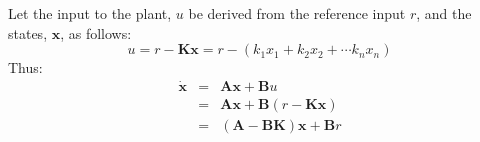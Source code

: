 Let the input to the plant, $u$ be derived from the reference input $r$, and the states, $\mathbf{x}$, as follows:
\[
u=r-\mathbf{Kx}=r-(k_1x_1+k_2x_2+\cdots k_nx_n)
\]
Thus:
\begin{eqnarray*}
	\dot{\mathbf{x}} & = & \mathbf{Ax}+\mathbf{B}u \\
	                 & = & \mathbf{Ax}+\mathbf{B}(r - \mathbf{Kx}) \\
	                 & = & (\mathbf{A}-\mathbf{BK})\mathbf{x}+\mathbf{B}r \\	
\end{eqnarray*}

\endinput

